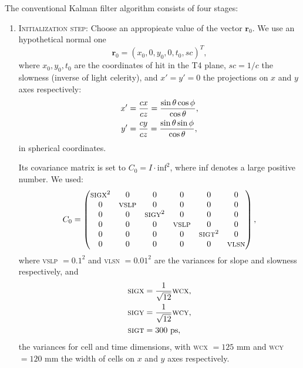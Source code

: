\documentclass[a4paper]{book}
\let\vec\mathbf  %
\begin{document}
The conventional Kalman filter algorithm consists of four stages:
\begin{enumerate}
	\item \textsc{Initialization step:} Choose an appropieate value of the vector $\vec{r}_0$. We use an hypothetical normal one
	\begin{equation}
	\vec{r}_0 = (x_0, 0, y_0, 0, t_0, sc)^T,
	\label{eq:ro}
	\end{equation}
	where $x_0, y_0, t_0$ are the coordinates of hit in the T4 plane, $sc = 1/c$ the slowness (inverse of light celerity), and $x' = y' = 0$ the projections on $x$ and $y$ axes respectively:
	\begin{align}
	\notag
	x' &= \frac{cx}{cz} = \frac{\sin\theta \cos \phi}{\cos \theta},\\
	y' &= \frac{cy}{cz} = \frac{\sin\theta \sin \phi}{\cos \theta},
	\label{eq:xpyp}
	\end{align}
	in spherical coordinates.
	
	Its covariance matrix is set to $C_0 = I \cdot \mathrm{inf}^2$, where inf denotes a large positive number. We used:
	\begin{equation}
	C_0 = 
	\left(
	\begin{matrix}
	\mathrm{\textsc{sigx}}^2 & 0           & 0               & 0           & 0               & 0      \\
	0             & \mathrm{\textsc{vslp}} & 0               & 0           & 0               & 0       \\
	0             & 0             & \mathrm{\textsc{sigy}}^2 & 0           & 0               & 0        \\
	0             & 0             & 0             & \mathrm{\textsc{vslp}} & 0               & 0         \\
	0             & 0             & 0             & 0             & \mathrm{\textsc{sigt}}^2 & 0          \\
	0             & 0             & 0             & 0             & 0             & \mathrm{\textsc{vlsn}} \\
	\end{matrix}\right),
	\end{equation}
	where \textsc{vslp} $= 0.1^2$ and \textsc{vlsn} $= 0.01^2$ are the variances for slope and slowness respectively, and
	\begin{align}
	\notag
	\mathrm{\textsc{sigx}} &= \frac{1}{\sqrt{12}} \mathrm{\textsc{wcx}},\\ \notag
	\mathrm{\textsc{sigy}} &= \frac{1}{\sqrt{12}} \mathrm{\textsc{wcy}},\\
	\mathrm{\textsc{sigt}} &= 300\ \mathrm{ps},
	\label{eq:sig}
	\end{align}
	the variances for cell and time dimensions, with \textsc{wcx} $= 125$ mm and \textsc{wcy} $= 120$ mm the width of cells on $x$ and $y$ axes respectively.
	

\end{enumerate}
\end{document}
